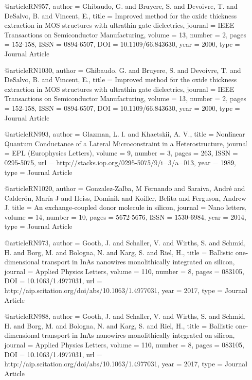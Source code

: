 @article{RN957,
   author = {Ghibaudo, G. and Bruyere, S. and Devoivre, T. and DeSalvo, B. and Vincent, E.},
   title = {Improved method for the oxide thickness extraction in MOS structures with ultrathin gate dielectrics},
   journal = {IEEE Transactions on Semiconductor Manufacturing},
   volume = {13},
   number = {2},
   pages = {152-158},
   ISSN = {0894-6507},
   DOI = {10.1109/66.843630},
   year = {2000},
   type = {Journal Article}
}

@article{RN1030,
   author = {Ghibaudo, G. and Bruyere, S. and Devoivre, T. and DeSalvo, B. and Vincent, E.},
   title = {Improved method for the oxide thickness extraction in MOS structures with ultrathin gate dielectrics},
   journal = {IEEE Transactions on Semiconductor Manufacturing},
   volume = {13},
   number = {2},
   pages = {152-158},
   ISSN = {0894-6507},
   DOI = {10.1109/66.843630},
   year = {2000},
   type = {Journal Article}
}

@article{RN993,
   author = {Glazman, L. I. and Khaetskii, A. V.},
   title = {Nonlinear Quantum Conductance of a Lateral Microconstraint in a Heterostructure},
   journal = {EPL (Europhysics Letters)},
   volume = {9},
   number = {3},
   pages = {263},
   ISSN = {0295-5075},
   url = {http://stacks.iop.org/0295-5075/9/i=3/a=013},
   year = {1989},
   type = {Journal Article}
}

@article{RN1020,
   author = {Gonzalez-Zalba, M Fernando and Saraiva, André and Calderón, María J and Heiss, Dominik and Koiller, Belita and Ferguson, Andrew J},
   title = {An exchange-coupled donor molecule in silicon},
   journal = {Nano letters},
   volume = {14},
   number = {10},
   pages = {5672-5676},
   ISSN = {1530-6984},
   year = {2014},
   type = {Journal Article}
}

@article{RN973,
   author = {Gooth, J. and Schaller, V. and Wirths, S. and Schmid, H. and Borg, M. and Bologna, N. and Karg, S. and Riel, H.},
   title = {Ballistic one-dimensional transport in InAs nanowires monolithically integrated on silicon},
   journal = {Applied Physics Letters},
   volume = {110},
   number = {8},
   pages = {083105},
   DOI = {10.1063/1.4977031},
   url = {http://aip.scitation.org/doi/abs/10.1063/1.4977031},
   year = {2017},
   type = {Journal Article}
}

@article{RN988,
   author = {Gooth, J. and Schaller, V. and Wirths, S. and Schmid, H. and Borg, M. and Bologna, N. and Karg, S. and Riel, H.},
   title = {Ballistic one-dimensional transport in InAs nanowires monolithically integrated on silicon},
   journal = {Applied Physics Letters},
   volume = {110},
   number = {8},
   pages = {083105},
   DOI = {10.1063/1.4977031},
   url = {http://aip.scitation.org/doi/abs/10.1063/1.4977031},
   year = {2017},
   type = {Journal Article}
}

